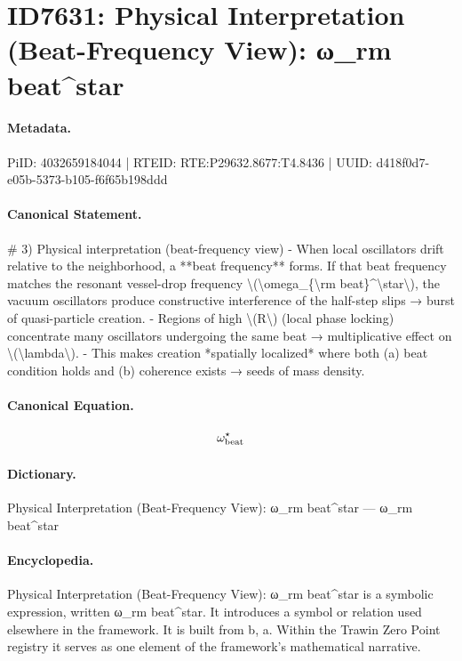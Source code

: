 \section*{ID7631: Physical Interpretation (Beat-Frequency View): ω\_rm beat\textasciicircum{}star}
\paragraph{Metadata.}
PiID: 4032659184044 | RTEID: RTE:P29632.8677:T4.8436 | UUID: d418f0d7-e05b-5373-b105-f6f65b198ddd

\paragraph{Canonical Statement.}
\# 3) Physical interpretation (beat-frequency view) - When local oscillators drift relative to the neighborhood, a **beat frequency** forms. If that beat frequency matches the resonant vessel-drop frequency \textbackslash{}(\textbackslash{}omega\_\{\textbackslash{}rm beat\}\textasciicircum{}\textbackslash{}star\textbackslash{}), the vacuum oscillators produce constructive interference of the half-step slips → burst of quasi-particle creation. - Regions of high \textbackslash{}(R\textbackslash{}) (local phase locking) concentrate many oscillators undergoing the same beat → multiplicative effect on \textbackslash{}(\textbackslash{}lambda\textbackslash{}). - This makes creation *spatially localized* where both (a) beat condition holds and (b) coherence exists → seeds of mass density.

\paragraph{Canonical Equation.}
\[
\omega_{\rm beat}^\star
\]

\paragraph{Dictionary.}
Physical Interpretation (Beat-Frequency View): ω\_rm beat\textasciicircum{}star — ω\_rm beat\textasciicircum{}star

\paragraph{Encyclopedia.}
Physical Interpretation (Beat-Frequency View): ω\_rm beat\textasciicircum{}star is a symbolic expression, written ω\_rm beat\textasciicircum{}star. It introduces a symbol or relation used elsewhere in the framework. It is built from b, a. Within the Trawin Zero Point registry it serves as one element of the framework's mathematical narrative.
